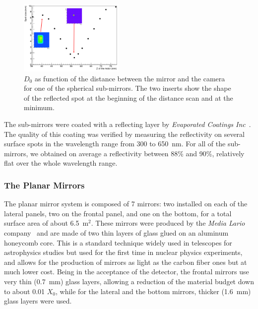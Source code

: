 \documentclass[5p,times,twocolumn]{elsarticle}
\begin{document}
\begin{figure}
\begin{center}
\includegraphics[width=0.45\textwidth]{SpotCMA.pdf}
\caption{$D_0$ as function of the distance between the mirror and the camera for one of the spherical sub-mirrors.
  The two inserts show the shape of the reflected spot at the beginning of the distance scan and at the minimum.}
\label{Fig:SpotCMA}
\end{center}
\end{figure}

The sub-mirrors were coated with a reflecting layer by {\it Evaporated Coatings Inc}~\cite{REF:ECI}. The quality of
this coating was verified by measuring the reflectivity on several surface spots in the wavelength range from 300 to
650~nm. For all of the sub-mirrors, we obtained on average a reflectivity between 88\% and 90\%, relatively flat over
the whole wavelength range.

\subsubsection{The Planar Mirrors}

The planar mirror system is composed of 7 mirrors: two installed on each of the lateral panels, two on the frontal panel,
and one on the bottom, for a total surface area of about 6.5~m$^2$. These mirrors were produced by the {\it Media
Lario} company~\cite{REF:MediaLario} and are made of two thin layers of glass glued on an aluminum honeycomb core.
This is a standard technique widely used in telescopes for astrophysics studies but used for the first time in nuclear
physics experiments, and allows for the production of mirrors as light as the carbon fiber ones but at much lower cost.
Being in the acceptance of the detector, the frontal mirrors use very thin (0.7~mm) glass layers, allowing a reduction of
the material budget down to about 0.01 $X_0$, while for the lateral and the bottom mirrors, thicker (1.6~mm) glass
layers were used.
\end{document}
